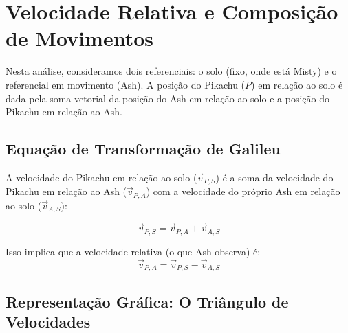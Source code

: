 \documentclass[11pt,a4paper]{article}
\begin{document}
\begin{center}
\end{center}

\section{Velocidade Relativa e Composição de Movimentos}

Nesta análise, consideramos dois referenciais: o solo (fixo, onde está Misty) e o referencial em movimento (Ash). A posição do Pikachu ($P$) em relação ao solo é dada pela soma vetorial da posição do Ash em relação ao solo e a posição do Pikachu em relação ao Ash.

\subsection{Equação de Transformação de Galileu}
A velocidade do Pikachu em relação ao solo ($\vec{v}_{P,S}$) é a soma da velocidade do Pikachu em relação ao Ash ($\vec{v}_{P,A}$) com a velocidade do próprio Ash em relação ao solo ($\vec{v}_{A,S}$):

\begin{equation}
\vec{v}_{P,S} = \vec{v}_{P,A} + \vec{v}_{A,S}
\end{equation}

Isso implica que a velocidade relativa (o que Ash observa) é:
\begin{equation}
\vec{v}_{P,A} = \vec{v}_{P,S} - \vec{v}_{A,S}
\end{equation}

\subsection{Representação Gráfica: O Triângulo de Velocidades}
\end{document}
